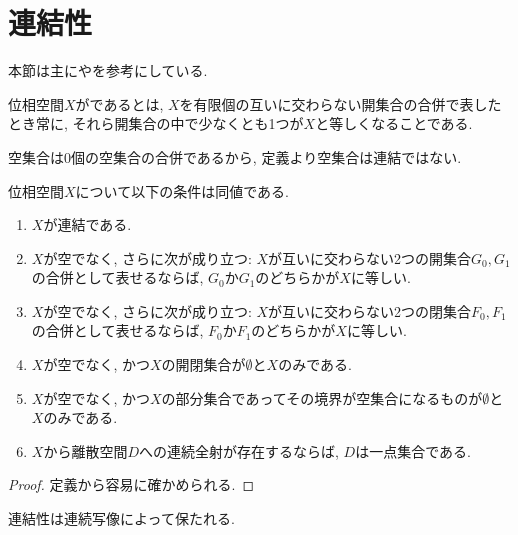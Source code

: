 \documentclass[uplatex, dvipdfmx, a4paper, 12pt, class=jsbook, crop=false]{standalone}
\begin{document}
\section{連結性}
\label{sec:connected-spaces}

\newcommand{\longrel}[1]{\ #1\ }

\begin{source}
	本節は主に\cite[Chapter 6]{Engelking1989GT}や\cite[第４章]{Morita1981ja}を参考にしている.
\end{source}

\begin{definition}
	位相空間$ X $がであるとは, $ X $を有限個の互いに交わらない開集合の合併で表したとき常に,
	それら開集合の中で少なくとも1つが$ X $と等しくなることである.
\end{definition}

空集合は0個の空集合の合併であるから, 定義より空集合は連結ではない.

\begin{proposition}
	\label{prop:Characterization of connectedness}
	位相空間$ X $について以下の条件は同値である.
		\begin{enumerate}
			\item $ X $が連結である.
			\item $ X $が空でなく, さらに次が成り立つ: $ X $が互いに交わらない2つの開集合$ G_0, G_1 $の合併として表せるならば,
			      $ G_0 $か$ G_1 $のどちらかが$ X $に等しい.
			\item $ X $が空でなく, さらに次が成り立つ: $ X $が互いに交わらない2つの閉集合$ F_0, F_1 $の合併として表せるならば,
			$ F_0 $か$ F_1 $のどちらかが$ X $に等しい.
			\item $ X $が空でなく, かつ$ X $の開閉集合が$ \emptyset $と$ X $のみである.
			\item $ X $が空でなく, かつ$ X $の部分集合であってその境界が空集合になるものが$ \emptyset $と$ X $のみである.
			\item $ X $から離散空間$ D $への連続全射が存在するならば, $ D $は一点集合である.
		\end{enumerate}
\end{proposition}

\begin{proof}
	定義から容易に確かめられる.
\end{proof}

\begin{proposition}
	\label{prop:Continuous maps preserve connectedness}
	連結性は連続写像によって保たれる.
\end{proposition}
\end{document}
